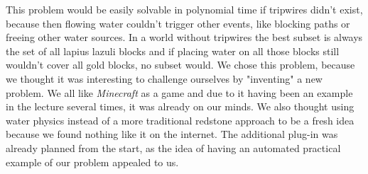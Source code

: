 \noindent This problem would be easily solvable in polynomial time if tripwires didn't exist, because then flowing water couldn't trigger other events, like blocking paths or freeing other water sources. In a world without tripwires the best subset is always the set of all lapius lazuli blocks and if placing water on all those blocks still wouldn't cover all gold blocks, no subset would.
\newline
\newline
\noindent We chose this problem, because we thought it was interesting to challenge ourselves by "inventing" a new problem. We all like \textit{Minecraft} as a game and due to it having been an example in the lecture several times, it was already on our minds. We also thought using water physics instead of a more traditional redstone approach to be a fresh idea because we found nothing like it on the internet. The additional plug-in was already planned from the start, as the idea of having an automated practical example of our problem appealed to us.